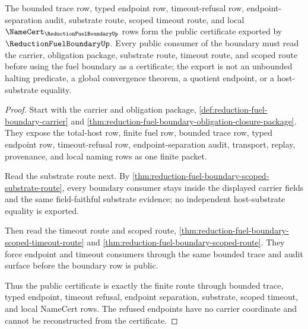 \begin{theorem}
\label{thm:reduction-fuel-boundary-public-certificate}
The bounded trace row, typed endpoint row, timeout-refusal row, endpoint-separation audit, substrate route, scoped timeout route, and local $\NameCert_{\ReductionFuelBoundaryUp}$ rows form the public certificate exported by $\ReductionFuelBoundaryUp$. Every public consumer of the boundary must read the carrier, obligation package, substrate route, timeout route, and scoped route before using the fuel boundary as a certificate; the export is not an unbounded halting predicate, a global convergence theorem, a quotient endpoint, or a host-substrate equality.
\end{theorem}
\begin{proof}
Start with the carrier and obligation package, \autoref{def:reduction-fuel-boundary-carrier} and \autoref{thm:reduction-fuel-boundary-obligation-closure-package}. They expose the total-host row, finite fuel row, bounded trace row, typed endpoint row, timeout-refusal row, endpoint-separation audit, transport, replay, provenance, and local naming rows as one finite packet.

Read the substrate route next. By \autoref{thm:reduction-fuel-boundary-scoped-substrate-route}, every boundary consumer stays inside the displayed carrier fields and the same field-faithful substrate evidence; no independent host-substrate equality is exported.

Then read the timeout route and scoped route, \autoref{thm:reduction-fuel-boundary-scoped-timeout-route} and \autoref{thm:reduction-fuel-boundary-scoped-route}. They force endpoint and timeout consumers through the same bounded trace and audit surface before the boundary row is public.

Thus the public certificate is exactly the finite route through bounded trace, typed endpoint, timeout refusal, endpoint separation, substrate, scoped timeout, and local NameCert rows. The refused endpoints have no carrier coordinate and cannot be reconstructed from the certificate.
\end{proof}


